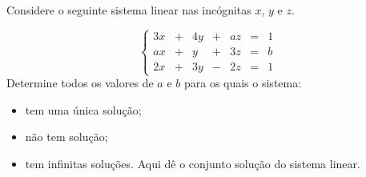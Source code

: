 \begin{problem} 
Considere o seguinte sistema linear nas incógnitas $x$, $y$ e $z$.

$$
\left\{\begin{array}{rrrrrrr}
3x & + & 4y & + &  az & = &  1\\
ax & + &  y & + &  3z & = &  b\\
2x & + & 3y & - &  2z & = &  1
\end{array} \right.$$\noindent Determine todos os valores de $a$ e $b$ para os quais o sistema:
\begin{itemize}
\item[(a)] tem uma única solução;
\item[(b)] não tem solução;
\item[(c)] tem infinitas soluções. Aqui dê o conjunto solução do sistema linear.
\end{itemize}
\end{problem}
